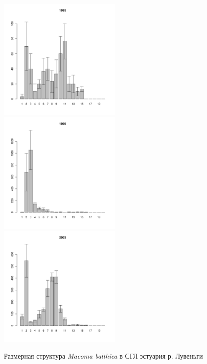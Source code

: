 \documentclass[12pt, a4paper]{article}
\begin{document}
\begin{figure}[h]
\begin{multicols}{3}
\hfill
\includegraphics[width=60mm]{../White_Sea/Estuatiy_Luvenga/sizestr_1995_.pdf}
\hfill
\includegraphics[width=60mm]{../White_Sea/Estuatiy_Luvenga/sizestr_1999_.pdf}
\hfill
\includegraphics[width=60mm]{../White_Sea/Estuatiy_Luvenga/sizestr_2003_.pdf}
\end{multicols}


\caption{Размерная структура {\it Macoma balthica} в СГЛ эстуария р. Лувеньги}
\label{ris:size_str_estuary_Luv}
\end{figure}
\end{document}
